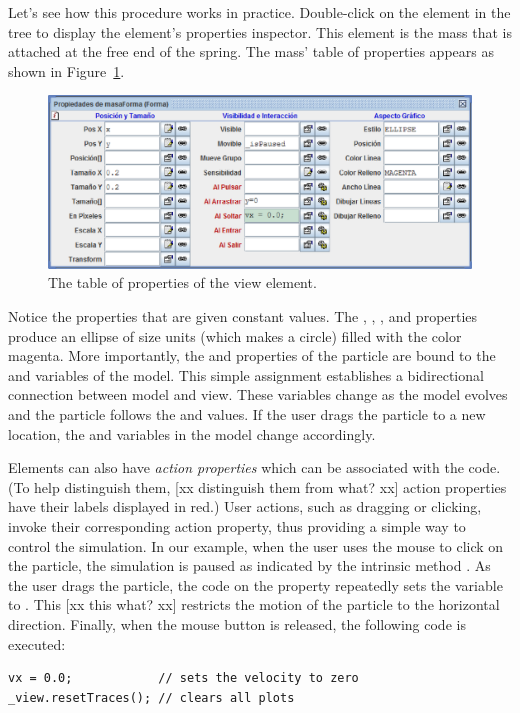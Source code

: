 Let's see how this procedure works in practice. Double-click on the  element in the tree to display the element's properties inspector. This element is the mass that is attached at the free end of the spring. The mass' table of properties appears as shown in Figure~\ref{fig:02EjsIntro/SpringBallProperties}.
\begin{figure}[htb]
    \centering
  \includegraphics[scale=\scale]{02EjsIntro/images/SpringBallProperties.eps}
    \caption{The table of properties of the  view element.}
    \label{fig:02EjsIntro/SpringBallProperties}
\end{figure}

Notice the properties that are given constant values. The , , , and  properties produce an ellipse of size  units (which makes a circle) filled with the color magenta. More importantly, the  and  properties of  the particle are bound to the  and  variables of the model. This simple assignment establishes a bidirectional connection between model and view. These variables change as the model evolves and the particle follows the  and  values. If the user drags the particle to a new location, the  and  variables in the model change accordingly.

Elements can also have \emph{action properties} which can be associated with the code. (To help distinguish them, [xx distinguish them from what? xx] action properties have their labels displayed in red.) User actions, such as dragging or clicking, invoke their corresponding action property, thus providing a simple way to control the simulation. In our example, when the user uses the mouse to click on the particle, the simulation is paused as indicated by the intrinsic method . As the user drags the particle, the code on the  property repeatedly sets the  variable to . This [xx this what? xx] restricts the motion of the particle to the horizontal direction. Finally, when the mouse button is released, the following code is executed:
\begin{listing}
\begin{verbatim}
vx = 0.0;            // sets the velocity to zero
_view.resetTraces(); // clears all plots
\end{verbatim}
\end{listing}

